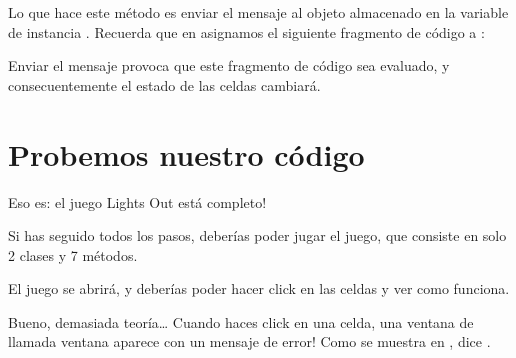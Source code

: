 \documentclass[a4paper,10pt,twoside]{book}
\begin{document}
{%

Lo que hace este m\'etodo es enviar el mensaje  al objeto almacenado en la variable de instancia .
Recuerda que en  asignamos el siguiente fragmento de c\'odigo a :


\noindent
Enviar el mensaje  provoca que este fragmento de c\'odigo sea evaluado, y consecuentemente el estado de las celdas cambiar\'a. 

\section{Probemos nuestro c\'odigo}

Eso es: el juego Lights Out est\'a completo!

Si has seguido todos los pasos, deber\'ias poder jugar el juego, que consiste en solo 2 clases y 7 m\'etodos.


El juego se abrir\'a, y deber\'ias poder hacer click en las celdas y ver como funciona. 

Bueno, demasiada teor\'ia\ldots{}
Cuando haces click en una celda, una ventana de  llamada ventana  aparece con un mensaje de error!
Como se muestra en , dice .

}
\end{document}
